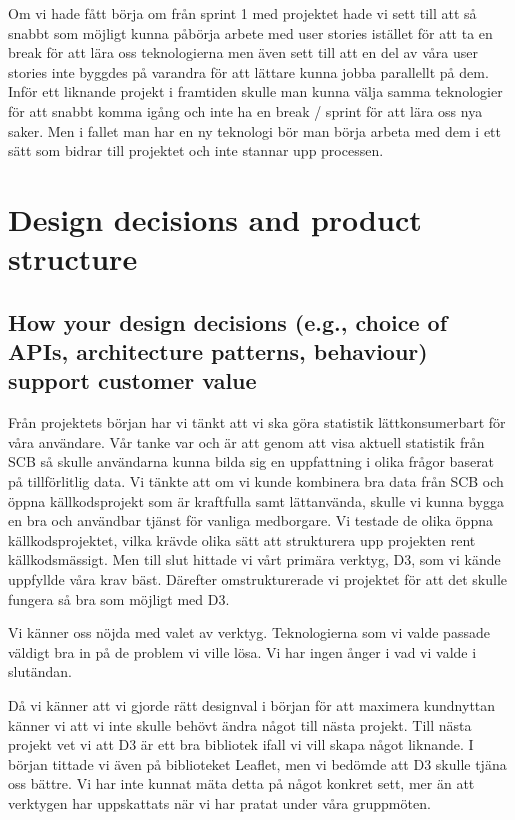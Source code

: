 \documentclass{scrartcl}
\begin{document}
Om vi hade fått börja om från sprint 1 med projektet hade vi sett till att så snabbt som möjligt kunna påbörja arbete med user stories istället för att ta en break för att lära oss teknologierna men även sett till att en del av våra user stories inte byggdes på varandra för att lättare kunna jobba parallellt på dem. Inför ett liknande projekt i framtiden skulle man kunna välja samma teknologier för att snabbt komma igång och inte ha en break / sprint för att lära oss nya saker. Men i fallet man har en ny teknologi bör man börja arbeta med dem i ett sätt som bidrar till projektet och inte stannar upp processen.

\section{Design decisions and product structure}
\subsection{How your design decisions (e.g., choice of APIs, architecture patterns, behaviour) support customer value}

Från projektets början har vi tänkt att vi ska göra statistik lättkonsumerbart för våra användare.
Vår tanke var och är att genom att visa aktuell statistik från SCB så skulle användarna kunna bilda sig en uppfattning i olika frågor baserat på tillförlitlig data.
Vi tänkte att om vi kunde kombinera bra data från SCB och öppna källkodsprojekt som är kraftfulla samt lättanvända, skulle vi kunna bygga en bra och användbar tjänst för vanliga medborgare.
Vi testade de olika öppna källkodsprojektet, vilka krävde olika sätt att strukturera upp projekten rent källkodsmässigt.
Men till slut hittade vi vårt primära verktyg, D3, som vi kände uppfyllde våra krav bäst.
Därefter omstrukturerade vi projektet för att det skulle fungera så bra som möjligt med D3.


Vi känner oss nöjda med valet av verktyg.
Teknologierna som vi valde passade väldigt bra in på de problem vi ville lösa.
Vi har ingen ånger i vad vi valde i slutändan.


Då vi känner att vi gjorde rätt designval i början för att maximera kundnyttan känner vi att vi inte skulle behövt ändra något till nästa projekt.
Till nästa projekt vet vi att D3 är ett bra bibliotek ifall vi vill skapa något liknande.
I början tittade vi även på biblioteket Leaflet, men vi bedömde att D3 skulle tjäna oss bättre.
Vi har inte kunnat mäta detta på något konkret sett, mer än att verktygen har uppskattats när vi har pratat under våra gruppmöten.
\end{document}
